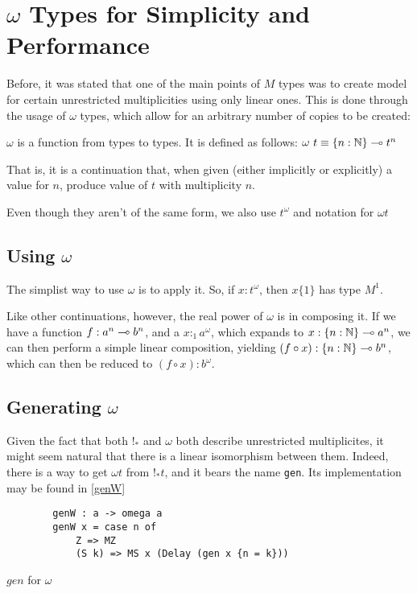 \section{$\omega$ Types for Simplicity and Performance}

Before, it was stated that one of the main points of $M$ types was to create model for certain unrestricted multiplicities using only linear ones.
This is done through the usage of $\omega$ types, which allow for an arbitrary number of copies to be created:

\begin{definition}
	$\omega$ is a function from types to types.
	It is defined as follows:
	$\omega \ t \equiv \{n : \mathbb{N}\} \multimap t^n$
\end{definition}

That is, it is a continuation that, when given (either implicitly or explicitly) a value for $n$, produce value of $t$ with multiplicity $n$.

\begin{note}
	Even though they aren't of the same form, we also use $t^\omega$ and notation for $\omega t$
\end{note}

\subsection{Using $\omega$}

The simplist way to use $\omega$ is to apply it. 
So, if $x : t^\omega$, then $x \{1\}$ has type $M^1$.

Like other continuations, however, the real power of $\omega$ is in composing it.
If we have a function $f : a^n \multimap b^n$, and a $x :_1 a^\omega$, which expands to $x : \{n : \mathbb{N}\} \multimap a^n$, we can then perform a simple linear composition, yielding $(f \circ x) : \{n : \mathbb{N} \} \multimap b^n$, which can then be reduced to $(f \circ x) : b^\omega$.

\subsection{Generating $\omega$}

Given the fact that both $!_*$ and $\omega$ both describe unrestricted multiplicites, it might seem natural that there is a linear isomorphism between them.
Indeed, there is a way to get $\omega t$ from $!_* t$, and it bears the name \verb|gen|.
Its implementation may be found in \ref{genW}

\begin{listing}
	\label{genW}
	\begin{verbatim}
		genW : a -> omega a 
		genW x = case n of
			Z => MZ
			(S k) => MS x (Delay (gen x {n = k}))
	\end{verbatim}
	\caption{$gen$ for $\omega$}
\end{listing}


